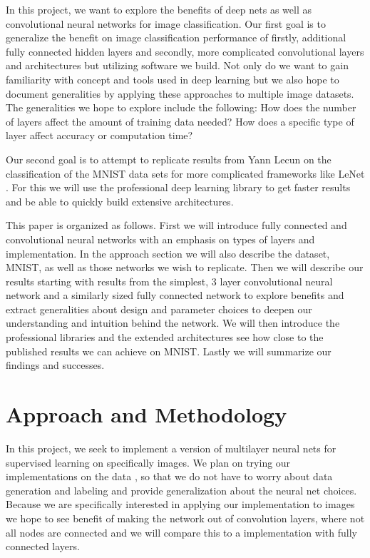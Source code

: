\documentclass[12pt, twocolumn]{article}
\begin{document}
In this project, we want to explore the benefits of deep nets as well as convolutional neural networks for image classification.  Our first goal is to generalize the benefit on image classification performance of firstly, additional fully connected hidden layers and secondly, more complicated convolutional layers and architectures but utilizing software we build. Not only do we want to gain familiarity with concept and tools used in deep learning but we also hope to document generalities by applying these approaches to multiple image datasets. The generalities we hope to explore include the following: How does the number of layers affect the amount of training data needed? How does a specific type of layer affect accuracy  or computation time? 

Our second goal is to attempt to replicate results from Yann Lecun on the classification of the MNIST data sets for more complicated frameworks like LeNet \cite{LeCun1998}. For this we will use the professional deep learning library to get faster results and be able to quickly build extensive architectures. 

This paper is organized as follows. First we will introduce fully connected and convolutional neural networks with an emphasis on types of layers and implementation. In the approach section we will also describe the dataset, MNIST, as well as those networks we wish to replicate.  Then we will describe our results starting with  results from the simplest, 3 layer convolutional neural network and a similarly sized fully connected network to explore benefits and extract generalities about design and parameter choices to deepen our understanding and intuition behind the network. We will then introduce the professional libraries and the extended architectures see how close to the published results we can achieve on MNIST. Lastly we will summarize our findings and successes.

\section{Approach and Methodology}
	
In this project, we seek to implement a version of multilayer neural nets for supervised learning on specifically images. We plan on trying our implementations on the data , so that we do not have to worry about data generation and labeling and provide generalization about the neural net choices. Because we are specifically interested in applying our implementation to images we hope to see benefit of making the network out of convolution layers, where not all nodes are connected and we will compare this to a implementation with fully connected layers.
\end{document}
